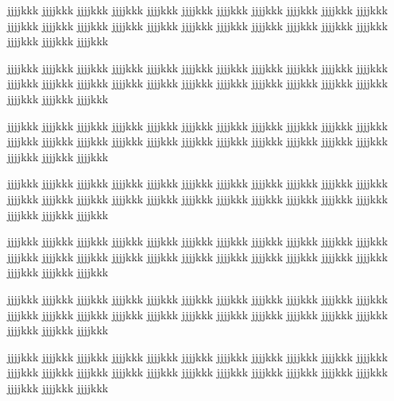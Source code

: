 jjjjkkk jjjjkkk jjjjkkk jjjjkkk jjjjkkk jjjjkkk jjjjkkk jjjjkkk jjjjkkk jjjjkkk jjjjkkk jjjjkkk jjjjkkk jjjjkkk jjjjkkk jjjjkkk jjjjkkk jjjjkkk jjjjkkk jjjjkkk jjjjkkk jjjjkkk jjjjkkk jjjjkkk jjjjkkk

jjjjkkk jjjjkkk jjjjkkk jjjjkkk jjjjkkk jjjjkkk jjjjkkk jjjjkkk jjjjkkk jjjjkkk jjjjkkk jjjjkkk jjjjkkk jjjjkkk jjjjkkk jjjjkkk jjjjkkk jjjjkkk jjjjkkk jjjjkkk jjjjkkk jjjjkkk jjjjkkk jjjjkkk jjjjkkk

jjjjkkk jjjjkkk jjjjkkk jjjjkkk jjjjkkk jjjjkkk jjjjkkk jjjjkkk jjjjkkk jjjjkkk jjjjkkk jjjjkkk jjjjkkk jjjjkkk jjjjkkk jjjjkkk jjjjkkk jjjjkkk jjjjkkk jjjjkkk jjjjkkk jjjjkkk jjjjkkk jjjjkkk jjjjkkk

jjjjkkk jjjjkkk jjjjkkk jjjjkkk jjjjkkk jjjjkkk jjjjkkk jjjjkkk jjjjkkk jjjjkkk jjjjkkk jjjjkkk jjjjkkk jjjjkkk jjjjkkk jjjjkkk jjjjkkk jjjjkkk jjjjkkk jjjjkkk jjjjkkk jjjjkkk jjjjkkk jjjjkkk jjjjkkk

jjjjkkk jjjjkkk jjjjkkk jjjjkkk jjjjkkk jjjjkkk jjjjkkk jjjjkkk jjjjkkk jjjjkkk jjjjkkk jjjjkkk jjjjkkk jjjjkkk jjjjkkk jjjjkkk jjjjkkk jjjjkkk jjjjkkk jjjjkkk jjjjkkk jjjjkkk jjjjkkk jjjjkkk jjjjkkk

jjjjkkk jjjjkkk jjjjkkk jjjjkkk jjjjkkk jjjjkkk jjjjkkk jjjjkkk jjjjkkk jjjjkkk jjjjkkk jjjjkkk jjjjkkk jjjjkkk jjjjkkk jjjjkkk jjjjkkk jjjjkkk jjjjkkk jjjjkkk jjjjkkk jjjjkkk jjjjkkk jjjjkkk jjjjkkk

jjjjkkk jjjjkkk jjjjkkk jjjjkkk jjjjkkk jjjjkkk jjjjkkk jjjjkkk jjjjkkk jjjjkkk jjjjkkk jjjjkkk jjjjkkk jjjjkkk jjjjkkk jjjjkkk jjjjkkk jjjjkkk jjjjkkk jjjjkkk jjjjkkk jjjjkkk jjjjkkk jjjjkkk jjjjkkk

